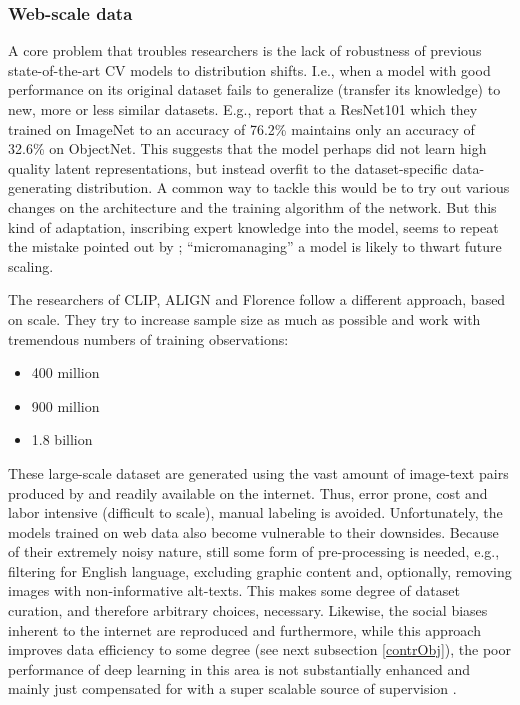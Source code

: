 \documentclass[
]{krantz}
\providecommand{\tightlist}{%
  \setlength{\itemsep}{0pt}\setlength{\parskip}{0pt}}
\begin{document}
\hypertarget{webScaleData}{%
\subsubsection{Web-scale data}\label{webScaleData}}

A core problem that troubles researchers is the lack of robustness of previous state-of-the-art CV models to distribution shifts.
I.e., when a model with good performance on its original dataset fails to generalize (transfer its knowledge) to new, more or less similar datasets.
E.g., \citet{radford2021learning} report that a ResNet101 which they trained on ImageNet to an accuracy of 76.2\% maintains only an accuracy of 32.6\% on ObjectNet.
This suggests that the model perhaps did not learn high quality latent representations, but instead overfit to the dataset-specific data-generating distribution.
A common way to tackle this would be to try out various changes on the architecture and the training algorithm of the network.
But this kind of adaptation, inscribing expert knowledge into the model, seems to repeat the mistake pointed out by \citet{sutton2019bitterlesson}; ``micromanaging'' a model is likely to thwart future scaling.

The researchers of CLIP, ALIGN and Florence follow a different approach, based on scale.
They try to increase sample size as much as possible and work with tremendous numbers of training observations:

\begin{itemize}
\tightlist
\item
  400 million \citep[CLIP;][]{radford2021learning}
\item
  900 million \citep[Florence;][]{yuan2021florence}
\item
  1.8 billion \citep[ALIGN;][]{jia2021scaling}
\end{itemize}

These large-scale dataset are generated using the vast amount of image-text pairs produced by and readily available on the internet.
Thus, error prone, cost and labor intensive (difficult to scale), manual labeling is avoided.
Unfortunately, the models trained on web data also become vulnerable to their downsides.
Because of their extremely noisy nature, still some form of pre-processing is needed, e.g., filtering for English language, excluding graphic content and, optionally, removing images with non-informative alt-texts.
This makes some degree of dataset curation, and therefore arbitrary choices, necessary.
Likewise, the social biases inherent to the internet are reproduced and furthermore, while this approach improves data efficiency to some degree (see next subsection \ref{contrObj}), the poor performance of deep learning in this area is not substantially enhanced and mainly just compensated for with a super scalable source of supervision \citep{radford2021learning}.
\end{document}
